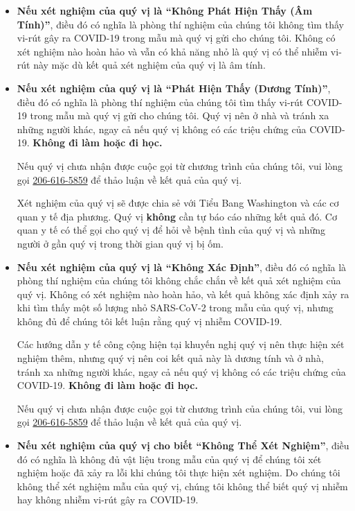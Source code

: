 \documentclass[10pt]{article}
\begin{document}
\begin{itemize}


\item

  \textbf{Nếu xét nghiệm của quý vị là ``Không Phát Hiện Thấy (Âm Tính)''}, điều
  đó có nghĩa là phòng thí nghiệm của chúng tôi không tìm thấy vi-rút gây ra
  COVID-19 trong mẫu mà quý vị gửi cho chúng tôi. Không có xét nghiệm nào hoàn
  hảo và vẫn có khả năng nhỏ là quý vị có thể nhiễm vi-rút này mặc dù kết quả
  xét nghiệm của quý vị là âm tính.

\item

  \textbf{Nếu xét nghiệm của quý vị là ``Phát Hiện Thấy (Dương Tính)''}, điều đó
  có nghĩa là phòng thí nghiệm của chúng tôi tìm thấy vi-rút COVID-19 trong mẫu
  mà quý vị gửi cho chúng tôi. Quý vị nên ở nhà và tránh xa những người khác,
  ngay cả nếu quý vị không có các triệu chứng của COVID-19. \textbf{Không đi làm
  hoặc đi học.}

  Nếu quý vị chưa nhận được cuộc gọi từ chương trình của chúng tôi, vui lòng gọi
  \href{tel:+1-206-616-5859}{206-616-5859} để thảo luận về kết quả của quý vị.

  Xét nghiệm của quý vị sẽ được chia sẻ với Tiểu Bang Washington và các cơ quan
  y tế địa phương. Quý vị \textbf{không} cần tự báo cáo những kết quả đó. Cơ
  quan y tế có thể gọi cho quý vị để hỏi về bệnh tình của quý vị và những người
  ở gần quý vị trong thời gian quý vị bị ốm.

\item

  \textbf{Nếu xét nghiệm của quý vị là ``Không Xác Định''}, điều đó có nghĩa là
  phòng thí nghiệm của chúng tôi không chắc chắn về kết quả xét nghiệm của quý
  vị. Không có xét nghiệm nào hoàn hảo, và kết quả không xác định xảy ra khi tìm
  thấy một số lượng nhỏ SARS-CoV-2 trong mẫu của quý vị, nhưng không đủ để chúng
  tôi kết luận rằng quý vị nhiễm COVID-19.

  Các hướng dẫn y tế công cộng hiện tại khuyến nghị quý vị nên thực hiện xét
  nghiệm thêm, nhưng quý vị nên coi kết quả này là dương tính và ở nhà, tránh xa
  những người khác, ngay cả nếu quý vị không có các triệu chứng của COVID-19.
  \textbf{Không đi làm hoặc đi học.}

  Nếu quý vị chưa nhận được cuộc gọi từ chương trình của chúng tôi, vui lòng gọi
  \href{tel:+1-206-616-5859}{206-616-5859} để thảo luận về kết quả của quý vị.

\item

  \textbf{Nếu xét nghiệm của quý vị cho biết ``Không Thể Xét Nghiệm''}, điều đó
  có nghĩa là không đủ vật liệu trong mẫu của quý vị để chúng tôi xét nghiệm
  hoặc đã xảy ra lỗi khi chúng tôi thực hiện xét nghiệm. Do chúng tôi không thể
  xét nghiệm mẫu của quý vị, chúng tôi không thể biết quý vị nhiễm hay không
  nhiễm vi-rút gây ra COVID-19.

\end{itemize}
\end{document}
